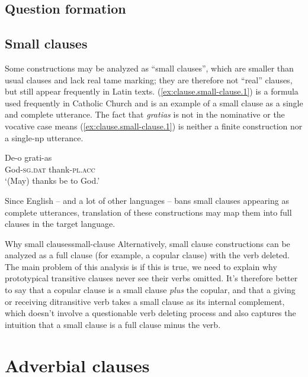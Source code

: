 \documentclass[a4paper, oneside, 12pt]{report}
\newcommand{\form}[1]{\emph{#1}}
\newcommand*{\category}[1]{\textsc{#1}}
\newcommand{\translate}[1]{`#1'}
\begin{document}
\section{Question formation}

\section{Small clauses}

Some constructions may be analyzed as ``small clauses'', 
which are smaller than usual clauses 
and lack real \acs{tame} marking;
they are therefore not ``real'' clauses, 
but still appear frequently in Latin texts.
(\ref{ex:clause.small-clause.1}) is a formula used frequently in Catholic Church 
and is an example of a small clause 
as a single and complete utterance.
The fact that \form{gratias} is not in the nominative or the vocative case 
means (\ref{ex:clause.small-clause.1}) is 
neither a finite construction nor a single-\acs{np} utterance.


\begin{exe}
    \ex \gll De-o grati-as \\
    God-\category{sg}.\category{dat} thank-\category{pl}.\category{acc} \\
    \glt \translate{(May) thanks be to God.}
    \label{ex:clause.small-clause.1}
\end{exe}

Since English -- and a lot of other languages -- 
bans small clauses appearing as complete utterances,
translation of these constructions may map them into full clauses in the target language. 

\begin{infobox}{Why small clauses}{small-clause}
    Alternatively, small clause constructions can be analyzed 
    as a full clause (for example, a copular clause) with the verb deleted.
    The main problem of this analysis is if this is true, 
    we need to explain why prototypical transitive clauses 
    never see their verbs omitted.
    It's therefore better to say 
    that a copular clause is a small clause \emph{plus} the copular,
    and that a giving or receiving ditransitive verb 
    takes a small clause as its internal complement,
    which doesn't involve a questionable verb deleting process
    and also captures the intuition that 
    a small clause is a full clause minus the verb.
\end{infobox}



\chapter{Adverbial clauses}
\end{document}
